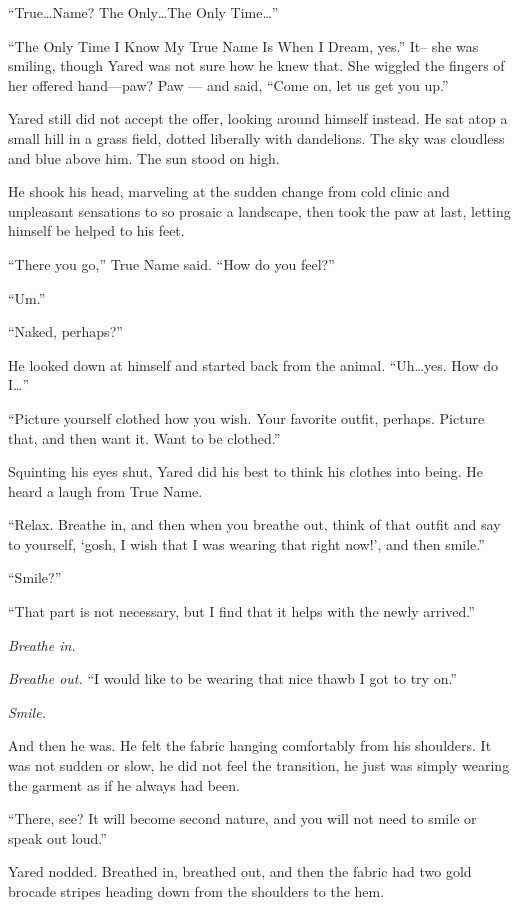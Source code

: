 ``True\ldots Name? The Only\ldots The Only Time\ldots{}''

``The Only Time I Know My True Name Is When I Dream, yes.'' It-- she was smiling, though Yared was not sure how he knew that. She wiggled the fingers of her offered hand---paw? Paw — and said, ``Come on, let us get you up.''

Yared still did not accept the offer, looking around himself instead. He sat atop a small hill in a grass field, dotted liberally with dandelions. The sky was cloudless and blue above him. The sun stood on high.

He shook his head, marveling at the sudden change from cold clinic and unpleasant sensations to so prosaic a landscape, then took the paw at last, letting himself be helped to his feet.

``There you go,'' True Name said. ``How do you feel?''

``Um.''

``Naked, perhaps?''

He looked down at himself and started back from the animal. ``Uh\ldots yes. How do I\ldots{}''

``Picture yourself clothed how you wish. Your favorite outfit, perhaps. Picture that, and then want it. Want to be clothed.''

Squinting his eyes shut, Yared did his best to think his clothes into being. He heard a laugh from True Name.

``Relax. Breathe in, and then when you breathe out, think of that outfit and say to yourself, `gosh, I wish that I was wearing that right now!', and then smile.''

``Smile?''

``That part is not necessary, but I find that it helps with the newly arrived.''

\emph{Breathe in.}

\emph{Breathe out.} ``I would like to be wearing that nice thawb I got to try on.''

\emph{Smile.}

And then he was. He felt the fabric hanging comfortably from his shoulders. It was not sudden or slow, he did not feel the transition, he just was simply wearing the garment as if he always had been.

``There, see? It will become second nature, and you will not need to smile or speak out loud.''

Yared nodded. Breathed in, breathed out, and then the fabric had two gold brocade stripes heading down from the shoulders to the hem.


